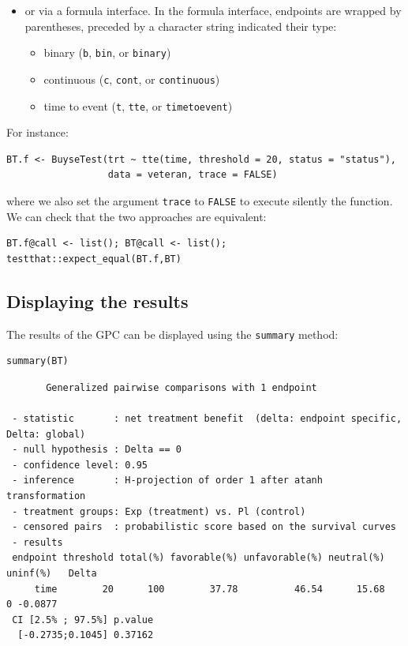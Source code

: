 \documentclass[12pt]{article}
\begin{document}
\clearpage

\begin{itemize}
\item or via a formula interface. In the formula interface, endpoints are
wrapped by parentheses, preceded by a character string indicated
their type:
\begin{itemize}[label={-}]
\item binary (\texttt{b}, \texttt{bin}, or \texttt{binary})
\item continuous (\texttt{c}, \texttt{cont}, or  \texttt{continuous})
\item time to event (\texttt{t}, \texttt{tte}, or \texttt{timetoevent})
\end{itemize}
\end{itemize}

For instance:
\lstset{language=r,label= ,caption= ,captionpos=b,numbers=none}
\begin{lstlisting}
BT.f <- BuyseTest(trt ~ tte(time, threshold = 20, status = "status"),
                  data = veteran, trace = FALSE)
\end{lstlisting}

where we also set the argument \texttt{trace} to \texttt{FALSE} to execute silently
the function. We can check that the two approaches are equivalent:
\lstset{language=r,label= ,caption= ,captionpos=b,numbers=none}
\begin{lstlisting}
BT.f@call <- list(); BT@call <- list();
testthat::expect_equal(BT.f,BT)
\end{lstlisting}

\subsection{Displaying the results}
\label{sec:org1cdee32}

The results of the GPC can be displayed using the \texttt{summary} method:
\lstset{language=r,label= ,caption= ,captionpos=b,numbers=none}
\begin{lstlisting}
summary(BT)
\end{lstlisting}

\begin{verbatim}
       Generalized pairwise comparisons with 1 endpoint

 - statistic       : net treatment benefit  (delta: endpoint specific, Delta: global) 
 - null hypothesis : Delta == 0 
 - confidence level: 0.95 
 - inference       : H-projection of order 1 after atanh transformation 
 - treatment groups: Exp (treatment) vs. Pl (control) 
 - censored pairs  : probabilistic score based on the survival curves
 - results
 endpoint threshold total(%) favorable(%) unfavorable(%) neutral(%) uninf(%)   Delta
     time        20      100        37.78          46.54      15.68        0 -0.0877
 CI [2.5% ; 97.5%] p.value 
  [-0.2735;0.1045] 0.37162
\end{verbatim}
\end{document}
